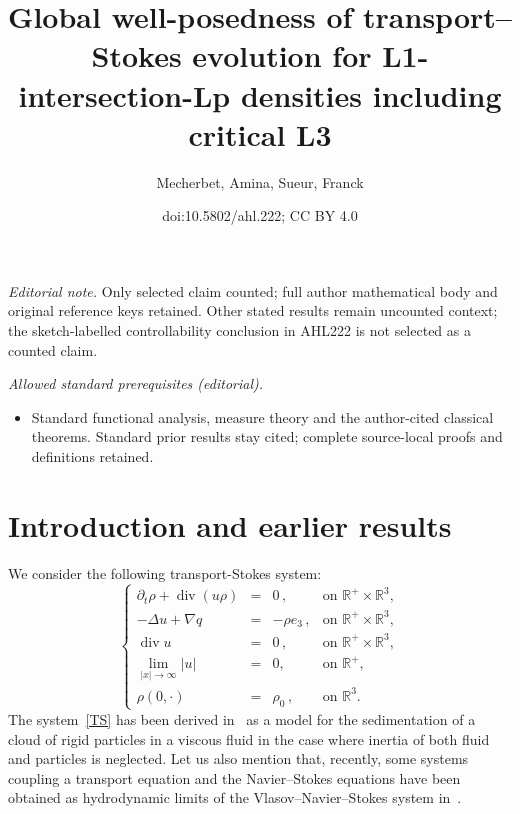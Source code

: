 \documentclass[10pt]{amsart}
\title{Global well-posedness of transport--Stokes evolution for L1-intersection-Lp densities including critical L3}
\author{Mecherbet, Amina, Sueur, Franck}
\date{doi:10.5802/ahl.222; CC BY 4.0}
\theoremstyle{definition}\newtheorem{defi}[theo]{Definition}\newtheorem{rema}[theo]{Remark}\newtheorem{exam}[theo]{Example}\newtheorem{exem}[theo]{Example}\newtheorem{nota}[theo]{Notation}
\newcommand{\R}{\mathbb{R}}
\renewcommand{\div}{\operatorname{div}}
\begin{document}
\maketitle
\noindent\textit{Editorial note.} Only selected claim counted; full author mathematical body and original reference keys retained. Other stated results remain uncounted context; the sketch-labelled controllability conclusion in AHL222 is not selected as a counted claim.\par\medskip
\noindent\textit{Allowed standard prerequisites (editorial).}\begin{itemize}
\item Standard functional analysis, measure theory and the author-cited classical theorems. Standard prior results stay cited; complete source-local proofs and definitions retained.
\end{itemize}\medskip


\section{Introduction and earlier results}

We consider the following transport-Stokes system:
\begin{equation}\label{TS}
\left\{
\begin{array}{rcll}
\partial_t \rho+{\div}(u \rho) &=& 0\,,& \text{on }\R^+ \times \R^3,\\
- \Delta u+ \nabla q &=& - \rho e_3 \,,& \text{on }\R^+ \times \R^3,\\
\div u & =&0\,,& \text{on }\R^+ \times \R^3,\\
\underset{|x|\to \infty}{\lim}|u| &=& 0,& \text{on } \R^+,\\
\rho(0,\cdot) &= & \rho_0 \,,&\text{on } \R^3.
\end{array}
\right.
\end{equation}
The system~\eqref{TS} has been derived in~\cite{Hofer, Mecherbet} as a model for the sedimentation of a cloud of rigid particles in a viscous fluid in the case where inertia of both fluid and particles is neglected. Let us also mention that, recently, some systems coupling a transport equation and the Navier--Stokes equations have been obtained as hydrodynamic limits of the Vlasov--Navier--Stokes system in~\cite{HKM}.
\end{document}
